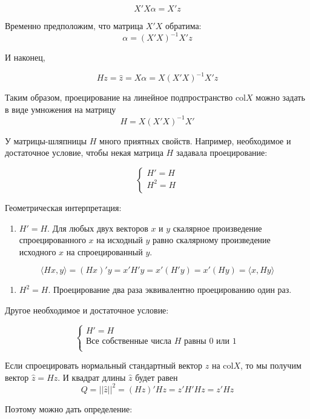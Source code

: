 \documentclass[11pt,russian,]{article}
\providecommand{\tightlist}{%
  \setlength{\itemsep}{0pt}\setlength{\parskip}{0pt}}
\newcommand{\1}{\mathbbm{1}}
\newcommand{\col}{\mathcal{col}}
\renewcommand{\col}{\mathrm{col}}
\begin{document}
\[
X'X\alpha = X'z
\]

Временно предположим, что матрица \(X'X\) обратима: \[
\alpha = (X'X)^{-1}X'z
\]

И наконец,

\[
Hz = \hat z = X\alpha = X(X'X)^{-1}X'z
\]

Таким образом, проецирование на линейное подпространство \(\col X\)
можно задать в виде умножения на матрицу \[
H=X(X'X)^{-1}X'
\]

У матрицы-шляпницы \(H\) много приятных свойств. Например, необходимое и
достаточное условие, чтобы некая матрица \(H\) задавала проецирование:

\[
\begin{cases}
H' = H \\
H^2 = H \\
\end{cases}
\]

Геометрическая интерпретация:

\begin{enumerate}
\def\labelenumi{\arabic{enumi}.}
\tightlist
\item
  \(H'=H\). Для любых двух векторов \(x\) и \(y\) скалярное произведение
  спроецированного \(x\) на исходный \(y\) равно скалярному произведение
  исходного \(x\) на спроецированный \(y\).
\end{enumerate}

\[
\langle Hx, y\rangle = (Hx)'y = x' H' y = x' (H'y) = x' (Hy) = \langle x, Hy \rangle
\]

\begin{enumerate}
\def\labelenumi{\arabic{enumi}.}
\setcounter{enumi}{1}
\tightlist
\item
  \(H^2=H\). Проецирование два раза эквивалентно проецированию один раз.
\end{enumerate}

Другое необходимое и достаточное условие:

\[
\begin{cases}
H' = H \\
\text{Все собственные числа } H \text{ равны } 0 \text{ или } 1\\
\end{cases}
\]

Если спроецировать нормальный стандартный вектор \(z\) на \(\col X\), то
мы получим вектор \(\hat z = Hz\). И квадрат длины \(\hat z\) будет
равен \[
Q=||\hat z ||^2 = (Hz)'Hz=z'H'Hz = z'Hz
\]

Поэтому можно дать определение:
\end{document}
